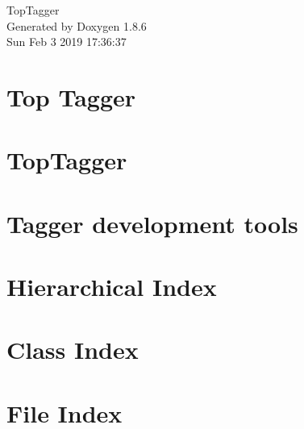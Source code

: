 \documentclass[twoside]{book}
\newcommand{\clearemptydoublepage}{%
  \newpage{\pagestyle{empty}\cleardoublepage}%
}
\begin{document}
\hypersetup{pageanchor=false}
\begin{titlepage}
\vspace*{7cm}
\begin{center}%
{\Large Top\-Tagger }\\
\vspace*{1cm}
{\large Generated by Doxygen 1.8.6}\\
\vspace*{0.5cm}
{\small Sun Feb 3 2019 17:36:37}\\
\end{center}
\end{titlepage}
\clearemptydoublepage
\tableofcontents
\clearemptydoublepage
{}
\hypersetup{pageanchor=true}

\chapter{Top Tagger}
\label{index}\hypertarget{index}{}
\chapter{Top\-Tagger}
\label{md__home_travis_build_susy2015_TopTagger_README}
\hypertarget{md__home_travis_build_susy2015_TopTagger_README}{}

\chapter{Tagger development tools}
\label{md__home_travis_build_susy2015_TopTagger_Tools_README}
\hypertarget{md__home_travis_build_susy2015_TopTagger_Tools_README}{}

\chapter{Hierarchical Index}

\chapter{Class Index}

\chapter{File Index}

\end{document}
